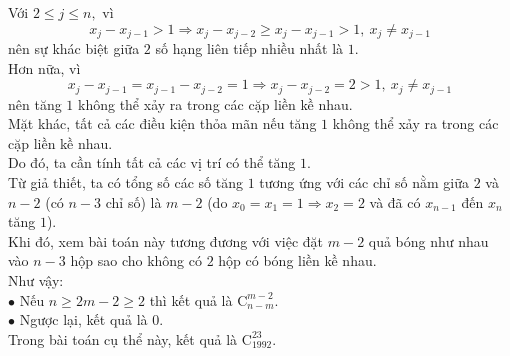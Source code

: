 \begin{ex}
{				Với $2 \leqslant j \leqslant n,$ vì 
				$$x_j-x_{j-1}>1 \Rightarrow x_j-x_{j-2} \geqslant x_j-x_{j-1}>1,~x_j \neq x_{j-1}$$
				nên sự khác biệt giữa $2$ số hạng liên tiếp nhiều nhất là $1.$\\
				Hơn nữa, vì
				$$x_j-x_{j-1}=x_{j-1}-x_{j-2}=1 \Rightarrow x_j-x_{j-2} =2>1,~x_j \neq x_{j-1}$$
				nên tăng $1$ không thể xảy ra trong các cặp liền kề nhau.\\
				Mặt khác, tất cả các điều kiện thỏa mãn nếu tăng $1$ không thể xảy ra trong các cặp liền kề nhau.\\
				Do đó, ta cần tính tất cả các vị trí có thể tăng $1.$\\
				Từ giả thiết, ta có tổng số các số tăng $1$ tương ứng với các chỉ số nằm giữa $2$ và $n-2$ (có $n-3$ chỉ số) là $m-2$ (do $x_0=x_1=1 \Rightarrow x_2=2$ và đã có $x_{n-1}$ đến $x_n$ tăng $1$).\\
				Khi đó, xem bài toán này tương đương với việc đặt $m-2$ quả bóng như nhau vào $n-3$ hộp sao cho không có $2$ hộp có bóng liền kề nhau.\\
				Như vậy:\\
				$\bullet$ Nếu $n \geqslant 2m-2 \geqslant 2$ thì kết quả là $\mathrm{C}_{n-m}^{m-2}.$\\
				$\bullet$ Ngược lại, kết quả là $0.$\\
				Trong bài toán cụ thể này, kết quả là $\mathrm{C}_{1992}^{23}.$
			}
		\end{ex}
